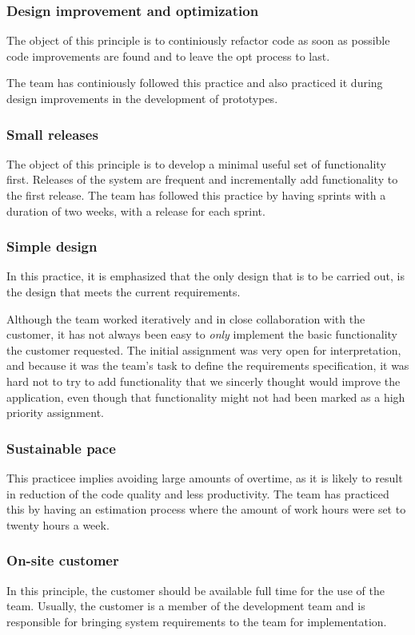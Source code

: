 \subsubsection{Design improvement and optimization}
The object of this principle is to continiously refactor code as soon as possible code improvements are found and to leave the \gls{opt} process to last. 

The team has continiously followed this practice and also practiced it during design improvements in the development of prototypes.
 
\subsubsection{Small releases}
The object of this principle is to develop a minimal useful set of functionality first. Releases of the system are frequent and incrementally add functionality to the first release. The team has followed this practice by having sprints with a duration of two weeks, with a release for each sprint.


\subsubsection{Simple design}
In this practice, it is emphasized that the only design that is to be carried out, is the design that meets the current requirements.

Although the team worked iteratively and in close collaboration with the customer, it has not always been easy to \emph{only} implement the basic functionality the customer requested. The initial assignment was very open for interpretation, and because it was the team's task to define the requirements specification, it was hard not to try to add functionality that we sincerly thought would improve the application, even though that functionality might not had been marked as a high priority assignment.


\subsubsection{Sustainable pace}
This practicee implies avoiding large amounts of overtime, as it is likely to result in reduction of the code quality and less productivity. The team has practiced this by having an estimation process where the amount of work hours were set to twenty hours a week.


\subsubsection{On-site customer}
In this principle, the customer should be available full time for the use of the team. Usually, the customer is a member of the development team and is responsible for bringing system requirements to the team for implementation.

